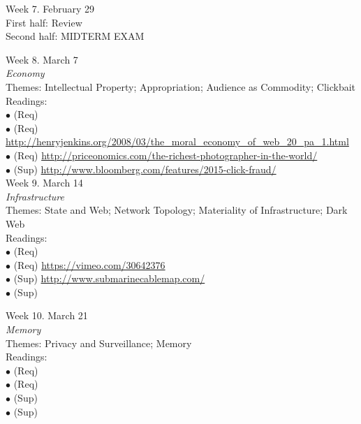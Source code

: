 \documentclass[10pt]{article}
\begin{document}
Week 7. February 29 \\
First half: Review \\
Second half: MIDTERM EXAM 

Week 8. March 7 \\
\textit{Economy} \\
Themes: Intellectual Property; Appropriation; Audience as Commodity; Clickbait \\
	Readings: \\
	$\bullet$ (Req) \\
	$\bullet$ (Req) \url{http://henryjenkins.org/2008/03/the_moral_economy_of_web_20_pa_1.html}\\
	$\bullet$ (Req) \url{http://priceonomics.com/the-richest-photographer-in-the-world/}\\
	$\bullet$ (Sup) \url{http://www.bloomberg.com/features/2015-click-fraud/}\\

Week 9. March 14 \\
\textit{Infrastructure} \\
Themes: State and Web; Network Topology; Materiality of Infrastructure; Dark Web \\
	Readings: \\
	$\bullet$ (Req) \\
	$\bullet$ (Req) \url{https://vimeo.com/30642376}\\
	$\bullet$ (Sup) \url{http://www.submarinecablemap.com/}\\
	$\bullet$ (Sup) 

Week 10. March 21 \\
\textit{Memory} \\
Themes: Privacy and Surveillance; Memory \\
	Readings: \\
	$\bullet$ (Req) \\
	$\bullet$ (Req) \\
	$\bullet$ (Sup) \\
	$\bullet$ (Sup) 
\end{document}

